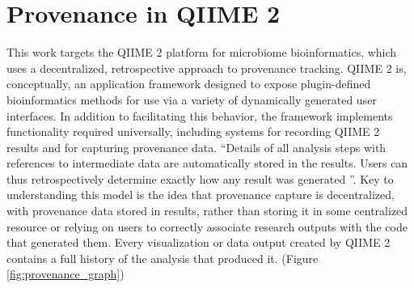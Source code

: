 \section{Provenance in QIIME 2}

This work targets the QIIME 2 platform for microbiome bioinformatics, which
uses a decentralized, retrospective approach to provenance tracking. QIIME 2 is,
conceptually, an application framework designed to expose plugin-defined
bioinformatics methods for use via a variety of dynamically generated user
interfaces. In addition to facilitating this behavior, the framework implements
functionality required universally, including systems for recording QIIME 2
results and for capturing provenance data. “Details of all analysis steps with
references to intermediate data are automatically stored in the results. Users
can thus retrospectively determine exactly how any result was generated \parencite[854]{bolyen_reproducible_2019}”.
Key to understanding this model is the idea that provenance capture is
decentralized, with provenance data stored in results, rather than storing it in
some centralized resource or relying on users to correctly associate research
outputs with the code that generated them. Every visualization or data output
created by QIIME 2 contains a full history of the analysis that produced it.
(Figure \ref{fig:provenance_graph})

